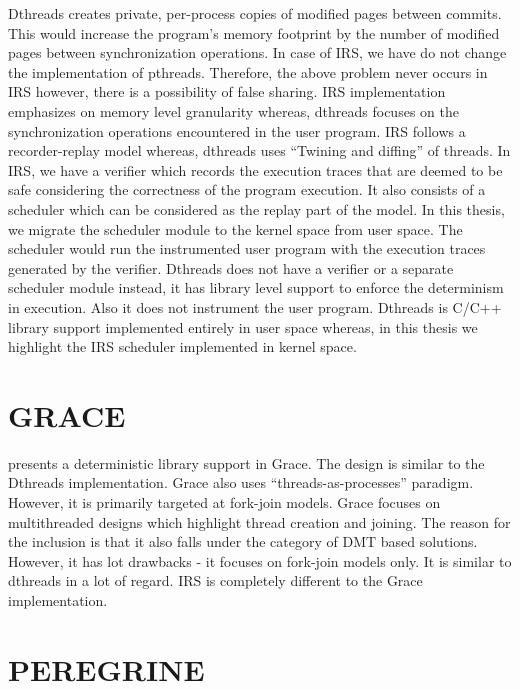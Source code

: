 Dthreads creates private, per-process copies of modified pages between commits. 
This would increase the program's memory footprint by the number of modified pages between synchronization operations. 
In case of IRS, we have do not change the implementation of pthreads. 
Therefore, the above problem never occurs in IRS however, there is a possibility of false sharing. 
IRS implementation emphasizes on memory level granularity whereas, dthreads focuses on the synchronization operations encountered in the user program. 
IRS follows a recorder-replay model whereas, dthreads uses ``Twining and diffing'' of threads. 
In IRS, we have a verifier which records the execution traces that are deemed to be safe considering the correctness of the program execution. 
It also consists of a scheduler which can be considered as the replay part of the model. 
In this thesis, we migrate the scheduler module to the kernel space from user space. 
The scheduler would run the instrumented user program with the execution traces generated by the verifier. 
Dthreads does not have a verifier or a separate scheduler module instead, it has library level support to enforce the determinism in execution. 
Also it does not instrument the user program. 
Dthreads is C/C++ library support implemented entirely in user space whereas, in this thesis we highlight the IRS scheduler implemented in kernel space. 

\section{GRACE}

\citet{grace} presents a deterministic library support in Grace. 
The design is similar to the Dthreads implementation. 
Grace also uses ``threads-as-processes'' paradigm. 
However, it is primarily targeted at fork-join models. 
Grace focuses on multithreaded designs which highlight thread creation and joining. 
The reason for the inclusion is that it also falls under the category of DMT based solutions.
However, it has lot drawbacks - it focuses on fork-join models only. 
It is similar to dthreads in a lot of regard.  
IRS is completely different to the Grace implementation.

\section{PEREGRINE}

